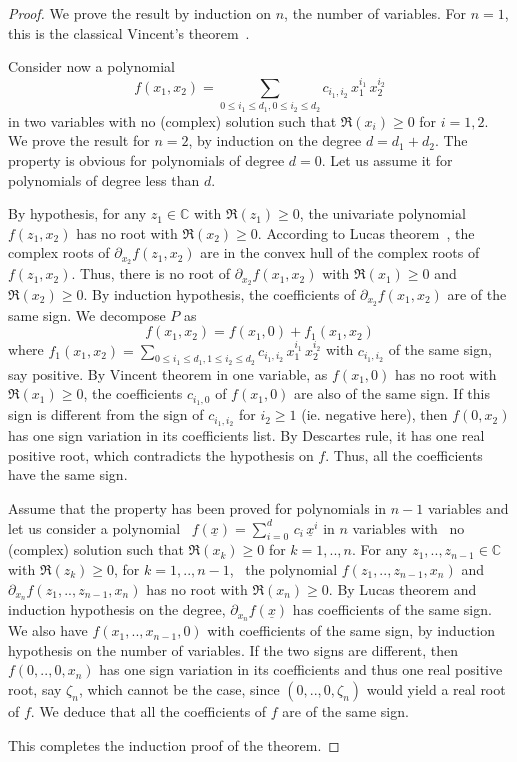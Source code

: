 \documentclass{sig-alternate}
\newcommand{\dott}{{..}}
\newcommand{\uvec}[1]{\underline{#1}}
\begin{document}
\begin{proof}
  We prove the result by induction on $n$, the number of
  variables. For $n = 1$, this is the classical Vincent's
  theorem~{\cite{Vincent}}.
  
  Consider now a polynomial 
  \[f(x_1, x_2) = \sum_{0 \le i_1 \le d_1, 0 \le i_2 \le d_2} c_{i_1,
    i_2} \, x_1^{i_1} \, x_2^{i_2} \] in two variables with no
  (complex) solution such that $\Re (x_i) \ge 0$ for $i = 1, 2$. We
  prove the result for $n = 2$, by induction on the degree $d= d_1 +
  d_2$. The property is obvious for polynomials of degree $d = 0$. Let
  us assume it for polynomials of degree less than $d$.
  
  By hypothesis, for any $z_1 \in \mathbb {C}$ with $\Re (z_1) \ge 0$,
  the univariate polynomial $f (z_1, x_2)$ has no root with $\Re (x_2)
  \ge 0$.  According to Lucas theorem~\cite{Marden1966}, the complex
  roots of $\partial_{x_2} f (z_1, x_2)$ are in the convex hull of the
  complex roots of $f (z_1, x_2)$. Thus, there is no root of
  $\partial_{x_2} f (x_1, x_2)$ with $\Re (x_1) \ge 0$ and $\Re (x_2)
  \ge 0$. By induction hypothesis, the coefficients of
  $\partial_{x_2}f (x_1, x_2)$ are of the same sign. We decompose $P$
  as
  \[ f (x_1, x_2) = f (x_1, 0) + f_1 (x_1, x_2) \] where $f_1 (x_1,
  x_2) = \sum_{0 \le i_1 \le d_1, 1 \le i_2 \le d_2} c_{i_1, i_2} \,
  x_1^{i_1} \, x_2^{i_2}$ with $c_{i_1, i_2}$ of the same sign, say
  positive. By Vincent theorem in one variable, as $f (x_1, 0)$ has no
  root with $\Re (x_1) \ge 0$, the coefficients $c_{i_1, 0}$ of $f
  (x_1, 0)$ are also of the same sign. If this sign is different from
  the sign of $c_{i_1, i_2}$ for $i_2 \geqslant 1$ (ie. negative
  here), then $f (0, x_2)$ has one sign variation in its coefficients
  list. By Descartes rule, it has one real positive root, which
  contradicts the hypothesis on $f$. Thus, all the coefficients have
  the same sign.
  
  Assume that the property has been proved for polynomials in $n - 1$
  variables and let us consider a polynomial \ $f (\uvec x) = \sum_{i=0}^d
  \, c_{i} \, \uvec x^{i}$ in $n$ variables with \ no (complex) solution
  such that $\Re (x_k) \ge 0$ for $k = 1, \dott, n$. For any $z_1,
  \dott, z_{n - 1} \in \mathbb C$ with $\Re (z_k) \ge 0$, for $k = 1,
  \dott, n - 1$, \ the polynomial $f (z_1, \dott, z_{n - 1}, x_n)$
  and $\partial_{x_n} f (z_1, \dott, z_{n - 1}, x_n)$ has no root
  with $\Re (x_n) \ge 0$. By Lucas theorem and induction hypothesis on
  the degree, $\partial_{x_n} f (\uvec x)$ has coefficients of the same
  sign. We also have $f (x_1, \dott, x_{n - 1}, 0)$ with coefficients
  of the same sign, by induction hypothesis on the number of
  variables. If the two signs are different, then $f (0, \dott, 0,
  x_n)$ has one sign variation in its coefficients and thus one real
  positive root, say $\zeta_n$, which cannot be the case, since
  $(0,\dott,0,\zeta_n)$ would yield a real root of $f$. We deduce
  that all the coefficients of $f$ are of the same sign.
  
  This completes the induction proof of the theorem.
\end{proof}
\end{document}
